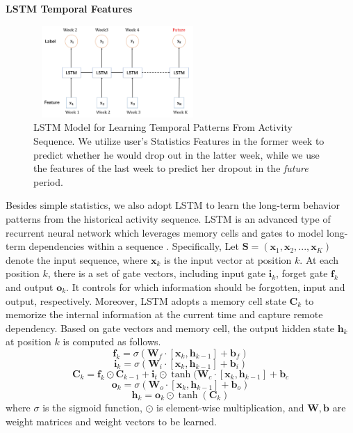 \noindent \textbf{LSTM Temporal Features}\\
	\begin{figure}
	\centering
	\includegraphics[width=6.4cm, height=3.5cm]{lstm.pdf}
	\caption{LSTM Model for Learning Temporal Patterns From Activity Sequence. We utilize user's Statistics Features in the former week to predict whether he would drop out in the latter week, while we use the features of the last week to predict her dropout in the \emph{future} period.}
	\label{fig:lstm}
\end{figure}
Besides simple statistics, we also adopt LSTM to learn the long-term behavior patterns from the historical activity sequence. LSTM  is an advanced type of recurrent neural network which leverages memory cells and gates to model long-term dependencies within a sequence \cite{Hochreiter1997Long}.  Specifically, Let $\mathbf{S}=(\mathbf{x}_1,\mathbf{x}_2,...,\mathbf{x}_K)$ denote the input sequence, where $\mathbf{x}_k$ is the input vector at position $k$. At each position $k$, there is a set of gate vectors, including input gate $\mathbf{i}_k$, forget gate $\mathbf{f}_k$ and output $\mathbf{o}_k$. It controls for which information should be forgotten, input and output, respectively. Moreover, LSTM adopts a memory cell state $\mathbf{C}_k$ to memorize the internal information at the current time and capture remote dependency. Based on gate vectors and memory cell, the output hidden state $\mathbf{h}_k$ at position $k$ is computed as follows. 
\begin{equation} \mathbf{f}_k = \sigma(\mathbf{W}_f\cdot [\mathbf{x}_k,\mathbf{h}_{k-1}]+\mathbf{b}_f) \end{equation}
\begin{equation} \mathbf{i}_k = \sigma(\mathbf{W}_i\cdot[\mathbf{x}_k,\mathbf{h}_{k-1}]+\mathbf{b}_i) \end{equation}
\begin{equation} \mathbf{C}_k = \mathbf{f}_k \odot \mathbf{C}_{k-1} + \mathbf{i}_t \odot \tanh(\mathbf{W}_c\cdot[\mathbf{x}_k,\mathbf{h}_{k-1}]+\mathbf{b}_c \end{equation}
\begin{equation} \mathbf{o}_k = \sigma(\mathbf{W}_o \cdot [\mathbf{x}_k,\mathbf{h}_{k-1}]+\mathbf{b}_o) \end{equation}
\begin{equation} \mathbf{h}_k = \mathbf{o}_k \odot \tanh(\mathbf{C}_k) \end{equation}
where $\sigma$ is the sigmoid function, $\odot$ is element-wise multiplication, and $\mathbf{W}, \mathbf{b}$ are weight matrices and weight vectors to be learned.\

